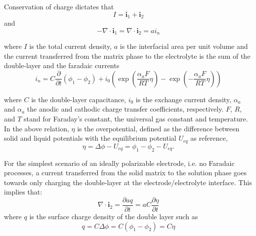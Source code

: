 \documentclass[]{article}
\begin{document}
Conservation of charge dictates that
\begin{equation}
I = \mathbf{i}_1 + \mathbf{i}_2
\end{equation}
and
\begin{equation}
-\nabla \cdot \mathbf{i}_1 = \nabla\cdot \mathbf{i}_2 = a {i}_n
\end{equation}

where $I$ is the total current density,
$a$ is the interfacial area per unit volume and the current transferred from the matrix phase to the electrolyte is the sum of the double-layer and the faradaic currents
\begin{equation}
{i}_n = C \frac{\partial}{\partial t} (\phi_1 - \phi_2)+
{i}_0 \left( \exp (\frac{\alpha_aF}{RT}\eta) - \exp (-\frac{\alpha_aF}{RT}\eta)
\right)
\end{equation}

where $C$ is the double-layer capacitance, ${i}_0$ is the exchange current density, $\alpha_{a}$ and $\alpha_{a}$ the anodic and cathodic charge transfer coefficients, respectively. $F$, $R$, and $T$ stand for Faraday’s constant, the universal gas constant and temperature. In the above relation, $\eta$ is the overpotential, defined as the difference between solid and liquid potentials with the equilibrium potential $U_{eq}$ as reference,
\[
\eta = \Delta \phi - U_{eq} = \phi_1 - \phi_2 - U_{eq}.
\]

For the simplest scenario of an ideally polarizable electrode, i.e. no Faradaic processes, a current transferred from the solid matrix to the solution phase goes towards only charging the double-layer at the electrode/electrolyte interface. This implies that:
%
\begin{equation}
\nabla\cdot \mathbf{i}_2 = \frac{\partial a q}{\partial t} = aC\frac{\partial \eta}{\partial t}
\end{equation}
%
where $q$ is the surface charge density of the double layer such as
%
\begin{equation}
q = C\Delta\phi = C(\phi_1 - \phi_2) = C\eta
\end{equation}
%
\end{document}
